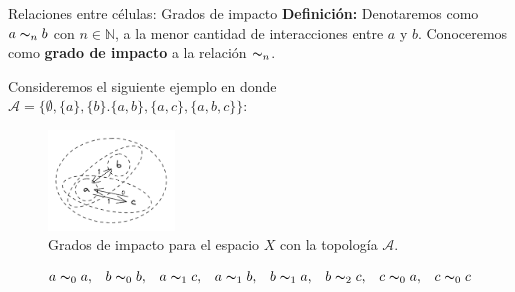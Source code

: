 \documentclass[9pt]{beamer}
\begin{document}
\begin{frame}{Relaciones entre células: Grados de impacto}
\textbf{Definición:} Denotaremos como $a\thicksim_n b$ con $n\in\mathbb{N}$, a la menor cantidad de interacciones entre $a$ y $b$. Conoceremos como \textbf{grado de impacto} a la relación $\thicksim_n$.

Consideremos el siguiente ejemplo en donde $\mathcal{A}=\{\emptyset,\{a\},\{b\}.\{a,b\},\{a,c\},\{a,b,c\}\}$:
\begin{figure}[h]
  \centering
    \includegraphics[width=0.3\textwidth]{Imagenes/grados_de_impacto.PNG}
  \caption{Grados de impacto para el espacio $X$ con la topología $\mathcal{A}$.}
  \label{fig:gradoImpacto}
\end{figure}
$$\begin{array}{cccccccc}
    a\thicksim_0 a, & b\thicksim_0 b, & a\thicksim_1 c, & a\thicksim_1 b, &
    b\thicksim_1 a, & b\thicksim_2 c, & c\thicksim_0 a, & c\thicksim_0 c
\end{array}$$
\end{frame}
\end{document}
